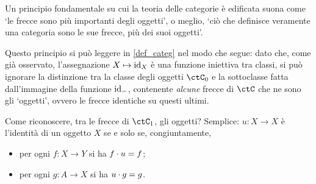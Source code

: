 \begin{remark}\label{cat_senza_oggetti}
 Un principio fondamentale su cui la teoria delle categorie è edificata suona come `le frecce sono più importanti degli oggetti', o meglio, `ciò che definisce veramente una categoria sono le sue frecce, più dei suoi oggetti'.

 Questo principio si può leggere in \ref{def_categ} nel modo che segue: dato che, come già osservato, l'assegnazione \(X\mapsto\Id[X]\) è una funzione iniettiva tra classi, si può ignorare la distinzione tra la classe degli oggetti \(\ctC_0\) e la sottoclasse fatta dall'immagine della funzione \(\Id[-]\), contenente \emph{alcune} frecce di \(\ctC\) che ne sono gli `oggetti', ovvero le frecce identiche su questi ultimi.

 Come riconoscere, tra le frecce di \(\ctC_1\), gli oggetti? Semplice: \(u \colon X\to X\) è l'identità di un oggetto \(X\) se e solo se, congiuntamente,
 \begin{itemize}
  \item per ogni \(f \colon X\to Y\) si ha \(f\cdot u = f\);
  \item per ogni \(g \colon A\to X\) si ha \(u\cdot g = g\).
 \end{itemize}
\end{remark}
